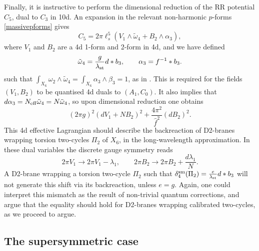 \documentclass[11pt]{article}
\def\a {\alpha}
\def\b {\beta}
\def\be{\begin{equation}}
\def\ee{\end{equation}}
\def\om{\omega}
\begin{document}
Finally, it is instructive to perform the dimensional reduction of the RR potential $C_5$, dual to $C_3$ in 10d. An expansion in the relevant non-harmonic $p$-forms \eqref{massivepforms} gives
\be
 C_{5} = 2\pi \ell_s^{5}\left( V_1 \wedge  \tilde{\omega}_4 +  B_2 \wedge \a_3 \right) , 
\label{C5sing}
\ee
where $V_1$ and $B_2$ are a 4d 1-form and 2-form in 4d, and we have defined
\be
 \tilde{\omega}_4  = \frac{g}{\lambda_{\rm st}} d * b_3 , \qquad \a_3 =  f^{-1} * b_3  .
 \label{tombe}
\ee
such that $\int_{X_6} \omega_2 \wedge \tilde{\omega}_4 = \int_{X_6} \a_3 \wedge \b_3 = 1$, as in \cite{Gurrieri:2002wz,DAuria:2004kwe,Grana:2005ny,Kashani-Poor:2006ofe}.  This is required for the fields $(V_1, B_2)$ to be quantised 4d duals to $(A_1, C_0)$. It also implies that $d\a_3 = N_{\rm eff} \tilde{\om}_4 = N \tilde{\om}_4$, so upon dimensional reduction one obtains 
\be
 (2\pi g)^2 \left( dV_1 + N B_2  \right)^2 + \frac{4\pi^2}{\hat{f}^{2}}  (dB_2)^2 .
\label{stuckdual}
\ee
This 4d effective Lagrangian should describe the backreaction of D2-branes wrapping torsion two-cycles $\Pi_2$ of $X_6$, in the long-wavelength approximation. In these dual variables the discrete gauge symmetry reads
\be
2\pi V_1 \to 2\pi V_1 - \lambda_1 , \qquad 2\pi B_2 \to  2\pi B_2 +  \frac{d\lambda_1}{N} .
\label{disgaugedual}
\ee
A D2-brane wrapping a torsion two-cycle $\Pi_2$ such that $\delta_4^{\rm sm}(\Pi_2) = \frac{e}{\lambda_{\rm st}} d* b_3$ will not generate this shift via its backreaction, unless $e = g$. Again, one could interpret this mismatch as the result of non-trivial quantum corrections, and argue that the equality should hold for D2-branes wrapping calibrated two-cycles, as we proceed to argue. 


\subsection{The supersymmetric case}
\label{ss:BPS}
\end{document}
